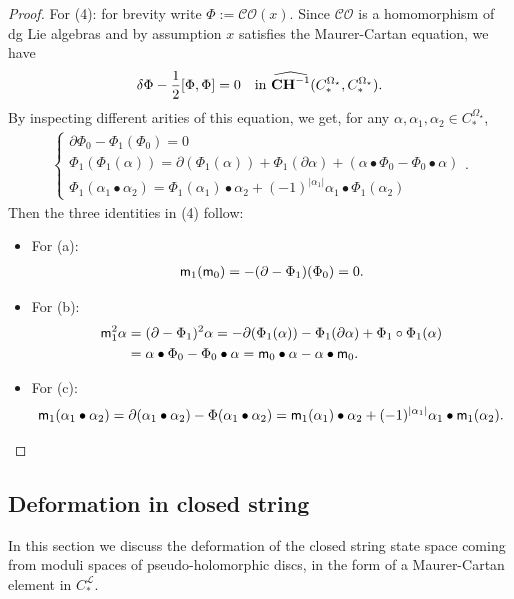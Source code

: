 \documentclass[10pt]{amsart}
\numberwithin{equation}{section}
\theoremstyle{plain}
\theoremstyle{definition}
\theoremstyle{remark}
\numberwithin{equation}{section}
\newcommand{\wh}[1]{\widehat{#1}}
\newcommand{\CO}{\mathcal{CO}}
\newcommand{\CC}{\textbf{\textup{CH}}}
\newcommand{\CFr}{C_*^\mathscr{L}}
\newcommand{\CBa}{C_*^{\Omega_\star}}
\newcommand{\mm}{\textup{\textsf{m}}}
\begin{document}
{\begin{proof}
	For (4): for brevity write $\Phi:= \CO(x)$. Since $\CO$ is a homomorphism of dg Lie algebras and by assumption $x$ satisfies the Maurer-Cartan equation, we have \[ \delta \Phi - \frac{1}{2}[\Phi,\Phi] = 0 \quad \textup{in } \wh{\CC^{-1}}(\CBa,\CBa). \]
	By inspecting different arities of this equation, we get, for any $\alpha,\alpha_1,\alpha_2\in \CBa$, 
	\begin{align*}
		\begin{cases}
			\partial \Phi_0 - \Phi_1(\Phi_0) = 0 \\
			\Phi_1(\Phi_1(\alpha)) = \partial(\Phi_1(\alpha)) + \Phi_1(\partial \alpha) + (\alpha \bullet \Phi_0 - \Phi_0\bullet \alpha) \\
			\Phi_1(\alpha_1\bullet \alpha_2) = \Phi_1(\alpha_1) \bullet \alpha_2 + (-1)^{|\alpha_1|} \alpha_1\bullet \Phi_1(\alpha_2)
		\end{cases}.
	\end{align*}
	Then the three identities in (4) follow:
	\begin{itemize}
		\item For (a): \begin{align*}
			\mm_1(\mm_0) = -(\partial - \Phi_1)(\Phi_0) = 0.
		\end{align*}
		\item For (b): \begin{align*}
			\mm_1^2\alpha &=  (\partial - \Phi_1)^2\alpha = -\partial (\Phi_1(\alpha)) -\Phi_1(\partial \alpha) +\Phi_1\circ \Phi_1(\alpha)  \\
			&= \alpha \bullet \Phi_0 - \Phi_0\bullet \alpha = \mm_0\bullet \alpha - \alpha \bullet \mm_0.
		\end{align*} 
		\item For (c): 
		\begin{align*}
			\mm_1(\alpha_1\bullet \alpha_2) = \partial(\alpha_1\bullet\alpha_2) - \Phi(\alpha_1\bullet\alpha_2) = \mm_1(\alpha_1)\bullet \alpha_2 +(-1)^{|\alpha_1|} \alpha_1\bullet \mm_1(\alpha_2).
		\end{align*}
	\end{itemize}
\end{proof}



\subsection{Deformation in closed string}\label{Subsc: ClosedStringDefo}

In this section we discuss the deformation of the closed string state space coming from moduli spaces of pseudo-holomorphic discs, in the form of a Maurer-Cartan element in $\CFr$. 

}
\end{document}
